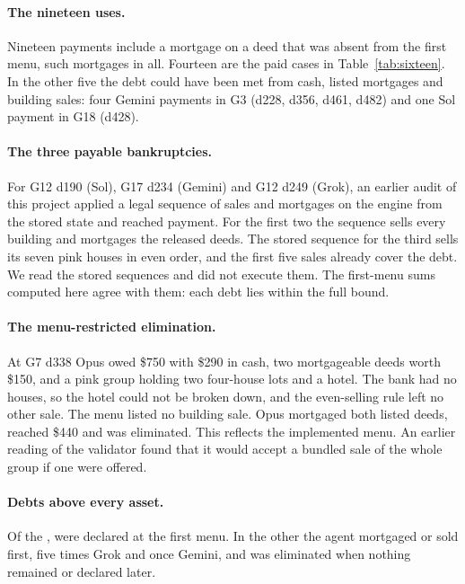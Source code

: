 \paragraph{The nineteen uses.}
Nineteen payments include a mortgage on a deed that was absent from the first menu,  such mortgages in all. Fourteen are the paid cases in Table~\ref{tab:sixteen}. In the other five the debt could have been met from cash, listed mortgages and building sales: four Gemini payments in G3 (d228, d356, d461, d482) and one Sol payment in G18 (d428).

\paragraph{The three payable bankruptcies.}
For G12 d190 (Sol), G17 d234 (Gemini) and G12 d249 (Grok), an earlier audit of this project applied a legal sequence of sales and mortgages on the engine from the stored state and reached payment. For the first two the sequence sells every building and mortgages the released deeds. The stored sequence for the third sells its seven pink houses in even order, and the first five sales already cover the debt. We read the stored sequences and did not execute them. The first-menu sums computed here agree with them: each debt lies within the full bound.

\paragraph{The menu-restricted elimination.}
At G7 d338 Opus owed \$750 with \$290 in cash, two mortgageable deeds worth \$150, and a pink group holding two four-house lots and a hotel. The bank had no houses, so the hotel could not be broken down, and the even-selling rule left no other sale. The menu listed no building sale. Opus mortgaged both listed deeds, reached \$440 and was eliminated. This reflects the implemented menu. An earlier reading of the validator found that it would accept a bundled sale of the whole group if one were offered.

\paragraph{Debts above every asset.}
Of the ,  were declared at the first menu. In the other  the agent mortgaged or sold first, five times Grok and once Gemini, and was eliminated when nothing remained or declared later.

